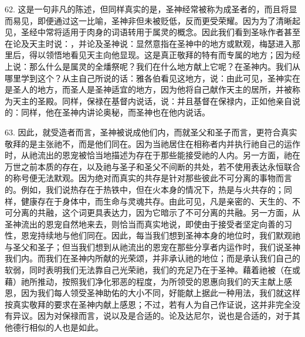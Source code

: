 62. 这是一句非凡的陈述，但同样真实的是，圣神经常被称为成圣者的，而且将显而易见，即便通过这一比喻，圣神非但未被贬低，反而更受荣耀。因为为了清晰起见，圣经中常将适用于肉身的词语转用于属灵的概念。因此我们看到圣咏作者甚至在论及天主时说：，并论及圣神说：显然意指在圣神中的地方或默观，梅瑟进入那里后，得以领悟地看见天主向他显现。这是真正敬拜的特有而专属的地方；因为经上说：那么什么是属灵的全燔祭呢？我们在什么地方献上它呢？在圣神内。我们从哪里学到这个？从主自己所说的话：雅各伯看见这地方，说：由此可见，圣神实在是圣人的地方，而圣人是圣神适宜的地方，因为他将自己献作天主的居所，并被称为天主的圣殿。同样，保禄在基督内说话，说：并且基督在保禄内，正如他亲自说的：同样，他在圣神内讲论奥秘，而圣神也在他内说话。\par

63. 因此，就受造者而言，圣神被说成他们内，而就圣父和圣子而言，更符合真实敬拜的是主张祂不，而是他们同在。因为当祂居住在相称者内并执行祂自己的运作时，从祂流出的恩宠被恰当地描述为存在于那些能接受祂的人内。另一方面，祂在万世之前本质的存在，以及祂与圣子和圣父不间断的共处，若不使用表达永恒联合的称号便无法默观。因为绝对而真实的共存是针对那些彼此不可分离的事物而言的。例如，我们说热存在于热铁中，但在火本身的情况下，热是与火共存的；同样，健康存在于身体中，而生命与灵魂共存。由此可见，凡是亲密的、天生的、不可分离的共融，这个词更具表达力，因为它暗示了不可分离的共融。另一方面，从圣神流出的恩宠自然地来去，则恰当而真实地说，即使由于接受者坚定向善的习性，恩宠持续地与他们同在。因此，每当我们想到圣神本身的地位时，我们默观祂与圣父和圣子；但当我们想到从祂流出的恩宠在那些分享者内运作时，我们说圣神我们内。而我们在圣神内所献的光荣颂，并非承认祂的地位；而是承认我们自己的软弱，同时表明我们无法靠自己光荣祂，我们的充足乃在于圣神。藉着祂被（在或藉）祂所推动，按照我们净化邪恶的程度，为所领受的恩惠向我们的天主献上感恩，因为我们每人领受圣神助佑的大小不同，好能献上据此一种用法，我们就这样按真实敬拜的要求在圣神内献上感恩；不过，若有人为自己作证说，这并非完全没有异议。因为对保禄而言，说以及是合适的。论及达尼尔，说也是合适的，对于其他德行相似的人也是如此。\par

